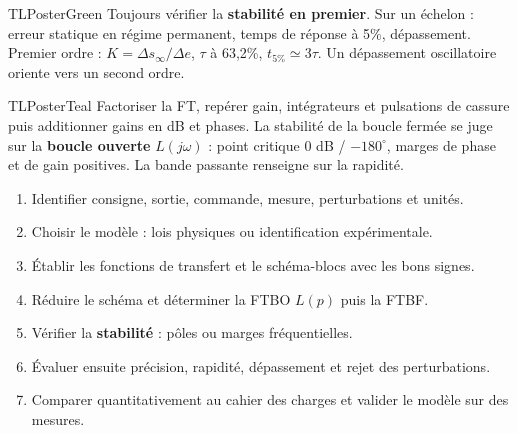 \documentclass[10pt,a3paper]{article}
\begin{document}
\begin{minipage}[t]{0.49\linewidth}
\begin{TLPosterBloc}{TLPosterGreen}
Toujours vérifier la \textbf{stabilité en premier}. Sur un échelon : erreur statique en régime permanent, temps de réponse à 5\%, dépassement. Premier ordre : $K=\Delta s_\infty/\Delta e$, $\tau$ à 63,2\%, $t_{5\%}\simeq3\tau$. Un dépassement oscillatoire oriente vers un second ordre.
\end{TLPosterBloc}
\begin{TLPosterBloc}{TLPosterTeal}
Factoriser la FT, repérer gain, intégrateurs et pulsations de cassure puis additionner gains en dB et phases. La stabilité de la boucle fermée se juge sur la \textbf{boucle ouverte} $L(j\omega)$ : point critique $0$ dB / $-180^\circ$, marges de phase et de gain positives. La bande passante renseigne sur la rapidité.
\end{TLPosterBloc}
\end{minipage}
\vfill
\begin{TLPosterMethode}
\begin{enumerate}
  \item Identifier consigne, sortie, commande, mesure, perturbations et unités.
  \item Choisir le modèle : lois physiques ou identification expérimentale.
  \item Établir les fonctions de transfert et le schéma-blocs avec les bons signes.
  \item Réduire le schéma et déterminer la FTBO $L(p)$ puis la FTBF.
  \item Vérifier la \textbf{stabilité} : pôles ou marges fréquentielles.
  \item Évaluer ensuite précision, rapidité, dépassement et rejet des perturbations.
  \item Comparer quantitativement au cahier des charges et valider le modèle sur des mesures.
\end{enumerate}
\end{TLPosterMethode}
\vfill
{}
\end{document}
